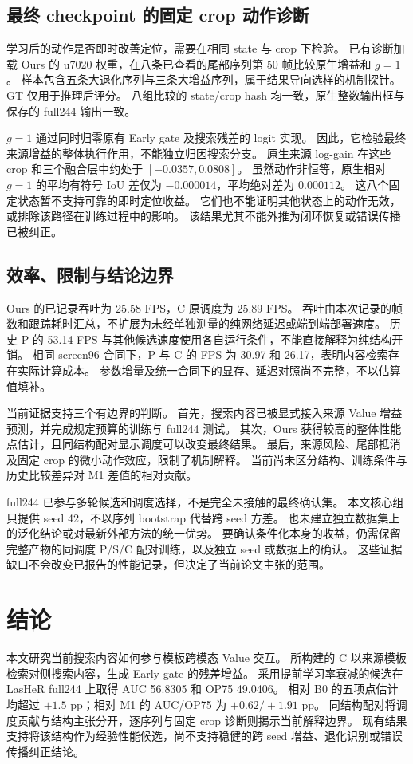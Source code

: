 \documentclass[journal]{IEEEtran}
\begin{document}
\subsection{最终 checkpoint 的固定 crop 动作诊断}
学习后的动作是否即时改善定位，需要在相同 state 与 crop 下检验。
已有诊断加载 Ours 的 u7020 权重，在八条已查看的尾部序列第 50 帧比较原生增益和 $g=1$。
样本包含五条大退化序列与三条大增益序列，属于结果导向选样的机制探针。
GT 仅用于推理后评分。
八组比较的 state/crop hash 均一致，原生整数输出框与保存的 full244 输出一致。

$g=1$ 通过同时归零原有 Early gate 及搜索残差的 logit 实现。
因此，它检验最终来源增益的整体执行作用，不能独立归因搜索分支。
原生来源 log-gain 在这些 crop 和三个融合层中约处于 $[-0.0357,0.0808]$。
虽然动作非恒等，原生相对 $g=1$ 的平均有符号 IoU 差仅为 $-0.000014$，平均绝对差为 $0.000112$。
这八个固定状态暂不支持可靠的即时定位收益。
它们也不能证明其他状态上的动作无效，或排除该路径在训练过程中的影响。
该结果尤其不能外推为闭环恢复或错误传播已被纠正。

\subsection{效率、限制与结论边界}
Ours 的已记录吞吐为 25.58 FPS，C 原调度为 25.89 FPS。
吞吐由本次记录的帧数和跟踪耗时汇总，不扩展为未经单独测量的纯网络延迟或端到端部署速度。
历史 P 的 53.14 FPS 与其他候选速度使用各自运行条件，不能直接解释为纯结构开销。
相同 screen96 合同下，P 与 C 的 FPS 为 30.97 和 26.17，表明内容检索存在实际计算成本。
参数增量及统一合同下的显存、延迟对照尚不完整，不以估算值填补。

当前证据支持三个有边界的判断。
首先，搜索内容已被显式接入来源 Value 增益预测，并完成规定预算的训练与 full244 测试。
其次，Ours 获得较高的整体性能点估计，且同结构配对显示调度可以改变最终结果。
最后，来源风险、尾部抵消及固定 crop 的微小动作效应，限制了机制解释。
当前尚未区分结构、训练条件与历史比较差异对 M1 差值的相对贡献。

full244 已参与多轮候选和调度选择，不是完全未接触的最终确认集。
本文核心组只提供 seed 42，不以序列 bootstrap 代替跨 seed 方差。
也未建立独立数据集上的泛化结论或对最新外部方法的统一优势。
要确认条件化本身的收益，仍需保留完整产物的同调度 P/S/C 配对训练，以及独立 seed 或数据上的确认。
这些证据缺口不会改变已报告的性能记录，但决定了当前论文主张的范围。

\section{结论}
本文研究当前搜索内容如何参与模板跨模态 Value 交互。
所构建的 C 以来源模板检索对侧搜索内容，生成 Early gate 的残差增益。
采用提前学习率衰减的候选在 LasHeR full244 上取得 AUC 56.8305 和 OP75 49.0406。
相对 B0 的五项点估计均超过 $+1.5$ pp；相对 M1 的 AUC/OP75 为 $+0.62/+1.91$ pp。
同结构配对将调度贡献与结构主张分开，逐序列与固定 crop 诊断则揭示当前解释边界。
现有结果支持将该结构作为经验性能候选，尚不支持稳健的跨 seed 增益、退化识别或错误传播纠正结论。
\end{document}
